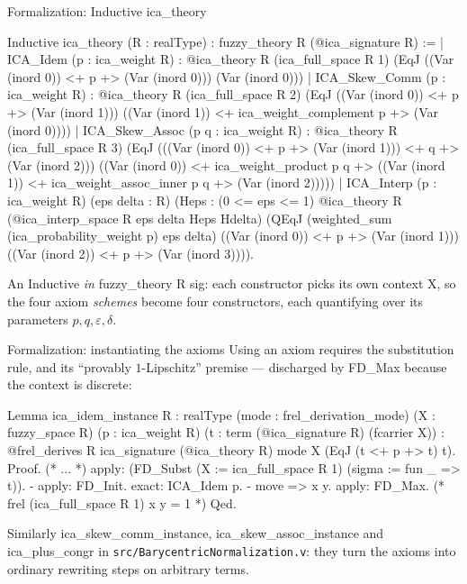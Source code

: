 \documentclass[10pt,aspectratio=169]{beamer}
\newcommand{\eps}{\varepsilon}
\newcommand{\file}[1]{{\color{rocqcon}\texttt{#1}}}
\newcommand{\rid}[1]{{\ttfamily\small #1}}
\begin{document}
\begin{frame}[fragile]{Formalization: \rid{Inductive ica\_theory}}
  \begin{srcbox}
Inductive ica_theory (R : realType) : fuzzy_theory R (@ica_signature R) :=
  | ICA_Idem (p : ica_weight R) :
      @ica_theory R (ica_full_space R 1)
        (EqJ ((Var (inord 0)) <+ p +> (Var (inord 0))) (Var (inord 0)))
  | ICA_Skew_Comm (p : ica_weight R) :
      @ica_theory R (ica_full_space R 2)
        (EqJ ((Var (inord 0)) <+ p +> (Var (inord 1)))
             ((Var (inord 1)) <+ ica_weight_complement p +> (Var (inord 0))))
  | ICA_Skew_Assoc (p q : ica_weight R) :
      @ica_theory R (ica_full_space R 3)
        (EqJ (((Var (inord 0)) <+ p +> (Var (inord 1))) <+ q +> (Var (inord 2)))
             ((Var (inord 0)) <+ ica_weight_product p q +>
               ((Var (inord 1)) <+ ica_weight_assoc_inner p q +> (Var (inord 2)))))
  | ICA_Interp (p : ica_weight R) (eps delta : R)
      (Heps : (0 <= eps <= 1)%
      @ica_theory R (@ica_interp_space R eps delta Heps Hdelta)
        (QEqJ (weighted_sum (ica_probability_weight p) eps delta)
          ((Var (inord 0)) <+ p +> (Var (inord 1)))
          ((Var (inord 2)) <+ p +> (Var (inord 3)))).
  \end{srcbox}
  \vfill
  An \rid{Inductive} \emph{in} \rid{fuzzy\_theory R sig}: each
  constructor picks its own context \rid{X}, so the four axiom
  \emph{schemes} become four constructors, each quantifying over its
  parameters $p,q,\eps,\delta$.
\end{frame}

\begin{frame}[fragile]{Formalization: instantiating the axioms}
  Using an axiom requires the substitution rule, and its
  ``provably $1$-Lipschitz'' premise --- discharged by \rid{FD\_Max}
  because the context is discrete:
  \begin{srcbox}
Lemma ica_idem_instance {R : realType} (mode : frel_derivation_mode)
    (X : fuzzy_space R) (p : ica_weight R)
    (t : term (@ica_signature R) (fcarrier X)) :
  @frel_derives R ica_signature (@ica_theory R) mode X (EqJ (t <+ p +> t) t).
Proof.
  (* ... *)
  apply: (FD_Subst (X := ica_full_space R 1) (sigma := fun _ => t)).
  - apply: FD_Init. exact: ICA_Idem p.
  - move => x y. apply: FD_Max.       (* frel (ica_full_space R 1) x y = 1 *)
Qed.
  \end{srcbox}
  \vfill
  Similarly \rid{ica\_skew\_comm\_instance},
  \rid{ica\_skew\_assoc\_instance} and \rid{ica\_plus\_congr} in
  \file{src/BarycentricNormalization.v}: they turn the axioms into
  ordinary rewriting steps on arbitrary terms.
\end{frame}
\end{document}
